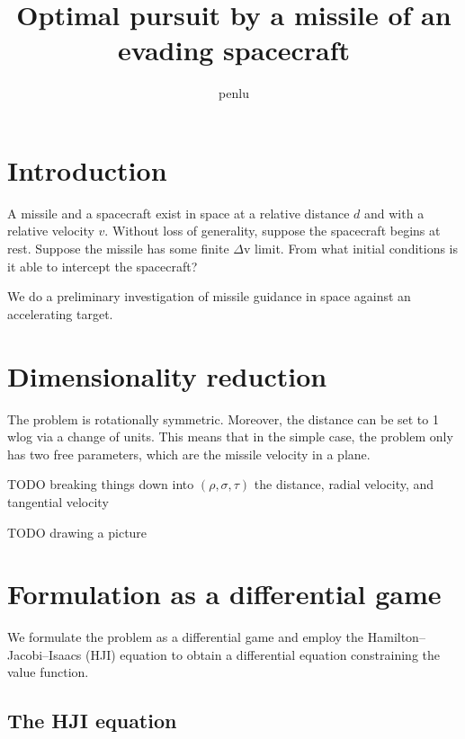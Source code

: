\documentclass{article}
\begin{document}
\title{Optimal pursuit by a missile of an evading spacecraft}
\author{penlu}

\maketitle

\section{Introduction}

A missile and a spacecraft exist in space at a relative distance $d$ and with a
relative velocity $v$.
Without loss of generality, suppose the spacecraft begins at rest.
Suppose the missile has some finite $\Delta$v limit.
From what initial conditions is it able to intercept the spacecraft?

We do a preliminary investigation of missile guidance in space against an
accelerating target.

\section{Dimensionality reduction}

The problem is rotationally symmetric. Moreover, the distance can be set to 1
wlog via a change of units. This means that in the simple case, the problem only
has two free parameters, which are the missile velocity in a plane.

TODO breaking things down into $(\rho, \sigma, \tau)$ the distance, radial
velocity, and tangential velocity

TODO drawing a picture

\section{Formulation as a differential game}

We formulate the problem as a differential game and employ the
Hamilton--Jacobi--Isaacs (HJI) equation to obtain a differential equation constraining
the value function.

\subsection{The HJI equation}
\end{document}
